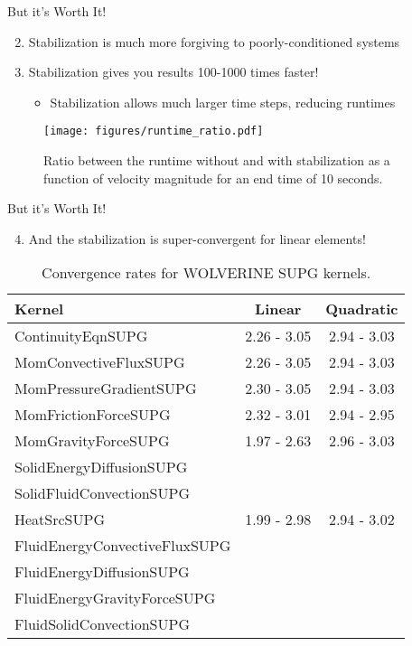 \documentclass{beamer}
\begin{document}

\begin{frame}{But it's Worth It!}

\begin{enumerate}
  \setcounter{enumi}{1}
\item Stabilization is much more forgiving to poorly-conditioned systems
\item Stabilization gives you results 100-1000 times faster!
	\begin{itemize}
		\item Stabilization allows much larger time steps, reducing runtimes
	\end{itemize}
\end{enumerate}

\begin{figure}[H]
  \centering
  \texttt{[image: figures/runtime\_ratio.pdf]}
  \caption{Ratio between the runtime without and with stabilization as a function of velocity magnitude for an end time of 10 seconds.}
\end{figure}

\end{frame}


\begin{frame}{But it's Worth It!}

\begin{enumerate}
  \setcounter{enumi}{3}
\item And the stabilization is super-convergent for linear elements!
\end{enumerate}

\begin{table}[H]
\caption{Convergence rates for WOLVERINE SUPG kernels.}
\centering
\begin{tabular}{l c c}
\hline\hline
Kernel & Linear & Quadratic\\ [0.5ex]
\hline
ContinuityEqnSUPG 				 & 2.26 - 3.05  	& 2.94 - 3.03\\
MomConvectiveFluxSUPG		 & 2.26 - 3.05  	& 2.94 - 3.03\\
MomPressureGradientSUPG 		 & 2.30 - 3.05	& 2.94 - 3.03\\
MomFrictionForceSUPG 			 & 2.32 - 3.01	& 2.94 - 2.95\\
MomGravityForceSUPG 			 & 1.97 - 2.63	& 2.96 - 3.03\\
SolidEnergyDiffusionSUPG 		 & &\\
SolidFluidConvectionSUPG 		 & &\\
HeatSrcSUPG 					 & 1.99 - 2.98	 & 2.94 - 3.02\\
FluidEnergyConvectiveFluxSUPG 	 & &\\
FluidEnergyDiffusionSUPG 		 & &\\
FluidEnergyGravityForceSUPG 	 & &\\
FluidSolidConvectionSUPG 		 & &\\
\hline
\end{tabular}
\end{table}

\end{frame}
\end{document}
